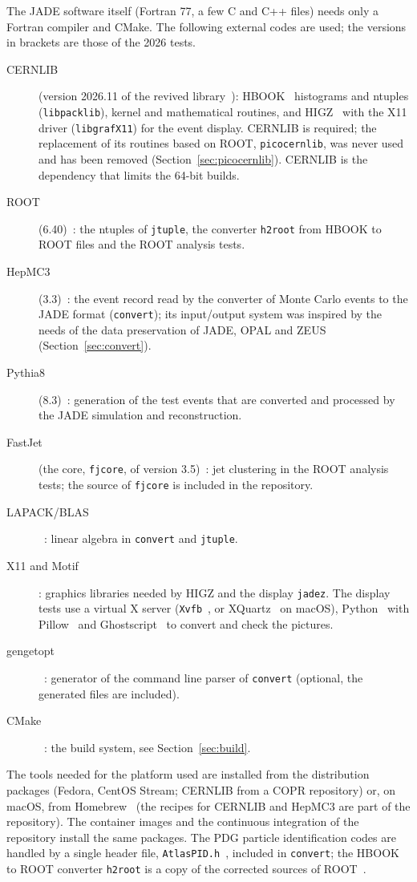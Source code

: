 The JADE software itself (Fortran 77, a few C and C++ files) needs only a Fortran compiler and CMake.
The following external codes are used; the versions in brackets are those of the 2026 tests.
\begin{description}
\item[CERNLIB] (version 2026.11 of the revived library~\cite{Schwickerath:2023cernlib,CERNLIB:web}):
HBOOK~\cite{Brun:1995hbook} histograms and ntuples (\texttt{libpacklib}), kernel and mathematical routines, and HIGZ~\cite{Couet:HIGZ} with the
X11 driver (\texttt{libgrafX11}) for the event display. CERNLIB is required; the replacement of its routines based on
ROOT, \texttt{picocernlib}, was never used and has been removed (Section~\ref{sec:picocernlib}). CERNLIB is the dependency that
limits the 64-bit builds.
\item[ROOT] (6.40)~\cite{Brun:1997pa,Antcheva:2009zz}: the ntuples of \texttt{jtuple}, the converter \texttt{h2root} from
HBOOK to ROOT files and the ROOT analysis tests.
\item[HepMC3] (3.3)~\cite{Buckley:2019xhk}: the event record read by the converter of Monte Carlo events
to the JADE format (\texttt{convert}); its input/output system was inspired by the needs of the data preservation of JADE, OPAL and ZEUS (Section~\ref{sec:convert}).
\item[Pythia8] (8.3)~\cite{Bierlich:2022pfr}: generation of the test events that are converted and processed
by the JADE simulation and reconstruction.
\item[FastJet] (the core, \texttt{fjcore}, of version 3.5)~\cite{Cacciari:2011ma}: jet clustering in the ROOT
analysis tests; the source of \texttt{fjcore} is included in the repository.
\item[LAPACK/BLAS]~\cite{lapack}: linear algebra in \texttt{convert} and \texttt{jtuple}.
\item[X11 and Motif]: graphics libraries needed by HIGZ and the display \texttt{jadez}. The display tests
use a virtual X server (\texttt{Xvfb}~\cite{Xvfb:web}, or XQuartz~\cite{XQuartz:web} on macOS), Python~\cite{Python:web} with Pillow~\cite{Pillow:web} and Ghostscript~\cite{Ghostscript:web}
to convert and check the pictures.
\item[gengetopt]~\cite{gengetopt:web}: generator of the command line parser of \texttt{convert}
(optional, the generated files are included).
\item[CMake]~\cite{CMake:web}: the build system, see Section~\ref{sec:build}.
\end{description}
The tools needed for the platform used are installed from the distribution packages (Fedora, CentOS
Stream; CERNLIB from a COPR repository) or, on macOS, from Homebrew~\cite{Homebrew:web} (the recipes for CERNLIB and HepMC3
are part of the repository). The container images and the continuous integration of the repository
install the same packages. The PDG particle identification codes are handled by a single header file,
\texttt{AtlasPID.h}~\cite{Verbytskyi:AtlasPID}, included in \texttt{convert}; the HBOOK to ROOT converter \texttt{h2root} is a copy of the
corrected sources of ROOT~\cite{ROOT:hbookfix}.

